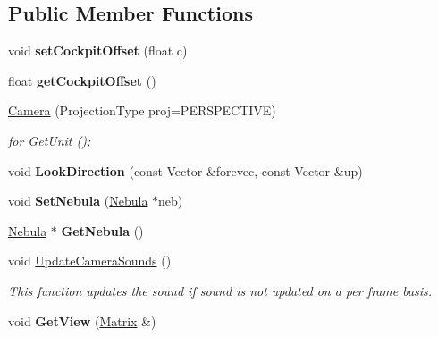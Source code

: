 \subsection*{Public Member Functions}
\begin{DoxyCompactItemize}
\item 
void {\bfseries set\+Cockpit\+Offset} (float c)\hypertarget{classCamera_a06684a517619efc0e55b3fcc1b139782}{}\label{classCamera_a06684a517619efc0e55b3fcc1b139782}

\item 
float {\bfseries get\+Cockpit\+Offset} ()\hypertarget{classCamera_ac3a12f6e9575a5c2f06c4df8c77e4dfc}{}\label{classCamera_ac3a12f6e9575a5c2f06c4df8c77e4dfc}

\item 
\hyperlink{classCamera_a3d906bcf7cb14fec2e62bc7dec9699a2}{Camera} (Projection\+Type proj=P\+E\+R\+S\+P\+E\+C\+T\+I\+VE)\hypertarget{classCamera_a3d906bcf7cb14fec2e62bc7dec9699a2}{}\label{classCamera_a3d906bcf7cb14fec2e62bc7dec9699a2}

\begin{DoxyCompactList}\small\item\em for Get\+Unit (); \end{DoxyCompactList}\item 
void {\bfseries Look\+Direction} (const Vector \&forevec, const Vector \&up)\hypertarget{classCamera_a7d8599b811ab34d4dbd5c268554f9cd4}{}\label{classCamera_a7d8599b811ab34d4dbd5c268554f9cd4}

\item 
void {\bfseries Set\+Nebula} (\hyperlink{classNebula}{Nebula} $\ast$neb)\hypertarget{classCamera_a43e6a60de275ff258b785febb3a7b107}{}\label{classCamera_a43e6a60de275ff258b785febb3a7b107}

\item 
\hyperlink{classNebula}{Nebula} $\ast$ {\bfseries Get\+Nebula} ()\hypertarget{classCamera_a86d5ea21457ab560fbe5b962c0d9237d}{}\label{classCamera_a86d5ea21457ab560fbe5b962c0d9237d}

\item 
void \hyperlink{classCamera_abc7d906afa5fbc4dbab916e967667b2e}{Update\+Camera\+Sounds} ()\hypertarget{classCamera_abc7d906afa5fbc4dbab916e967667b2e}{}\label{classCamera_abc7d906afa5fbc4dbab916e967667b2e}

\begin{DoxyCompactList}\small\item\em This function updates the sound if sound is not updated on a per frame basis. \end{DoxyCompactList}\item 
void {\bfseries Get\+View} (\hyperlink{classMatrix}{Matrix} \&)\hypertarget{classCamera_a598d450ce97e8b168de813afca4bc77a}{}\label{classCamera_a598d450ce97e8b168de813afca4bc77a}


\end{DoxyCompactItemize}
